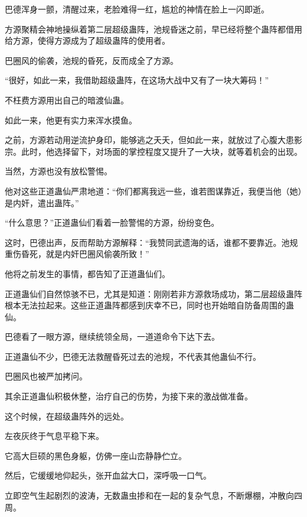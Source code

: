 
\begin{this_body}



巴德浑身一颤，清醒过来，老脸难得一红，尴尬的神情在脸上一闪即逝。

方源聚精会神地操纵着第二层超级蛊阵，池规昏迷之前，早已经将整个蛊阵都借用给方源，使得方源成为了超级蛊阵的使用者。

巴圈风的偷袭，池规的昏死，反而成全了方源。

“很好，如此一来，我借助超级蛊阵，在这场大战中又有了一块大筹码！”

不枉费方源用出自己的暗渡仙蛊。

如此一来，他更有实力来浑水摸鱼。

之前，方源若动用逆流护身印，能够逃之夭夭，但如此一来，就放过了心腹大患影宗。此时，他选择留下，对场面的掌控程度又提升了一大块，就等着机会的出现。

当然，方源也没有放松警惕。

他对这些正道蛊仙严肃地道：“你们都离我远一些，谁若图谋靠近，我便当他（她）是内奸，遣出蛊阵。”

“什么意思？”正道蛊仙们看着一脸警惕的方源，纷纷变色。

这时，巴德出声，反而帮助方源解释：“我赞同武遗海的话，谁都不要靠近。池规重伤昏死，就是内奸巴圈风偷袭所致！”

他将之前发生的事情，都告知了正道蛊仙们。

正道蛊仙们自然惊骇不已，尤其是知道：刚刚若非方源救场成功，第二层超级蛊阵根本无法拉起来。这些正道蛊阵都感到庆幸不已，同时也开始暗自防备周围的蛊仙。

巴德看了一眼方源，继续统领全局，一道道命令下达下去。

正道蛊仙不少，巴德无法救醒昏死过去的池规，不代表其他蛊仙不行。

巴圈风也被严加拷问。

其余正道蛊仙积极休整，治疗自己的伤势，为接下来的激战做准备。

这个时候，在超级蛊阵外的远处。

左夜灰终于气息平稳下来。

它高大巨硕的黑色身躯，仿佛一座山峦静静伫立。

然后，它缓缓地仰起头，张开血盆大口，深呼吸一口气。

立即空气生起剧烈的波涛，无数蛊虫掺和在一起的复杂气息，不断爆棚，冲散向四周。


\end{this_body}
